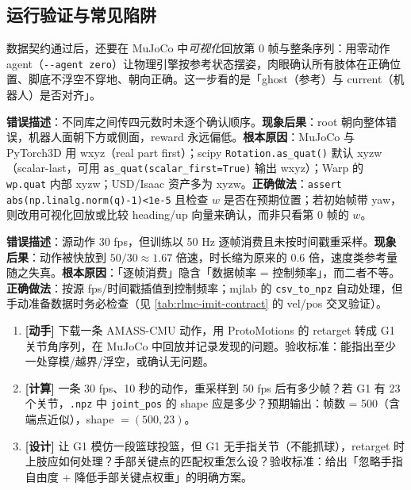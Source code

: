 \subsection{运行验证与常见陷阱}
\label{sec:rlmc-imit-data-verify}

数据契约通过后，还要在 MuJoCo 中\emph{可视化}回放第 0 帧与整条序列：用零动作 agent（\verb|--agent zero|）让物理引擎按参考状态摆姿，肉眼确认所有肢体在正确位置、脚底不浮空不穿地、朝向正确。这一步看的是「ghost（参考）与 current（机器人）是否对齐」。

\begin{pitfall}
\textbf{错误描述}：不同库之间传四元数时未逐个确认顺序。\textbf{现象后果}：root 朝向整体错误，机器人面朝下方或侧面，reward 永远偏低。\textbf{根本原因}：MuJoCo 与 PyTorch3D 用 wxyz（real part first）；scipy \texttt{Rotation.as\_quat()} 默认 xyzw（scalar-last，可用 \texttt{as\_quat(scalar\_first=True)} 输出 wxyz）；Warp 的 \texttt{wp.quat} 内部 xyzw；USD/Isaac 资产多为 xyzw。\textbf{正确做法}：\verb|assert abs(np.linalg.norm(q)-1)<1e-5| 且检查 $w$ 是否在预期位置；若初始帧带 yaw，则改用可视化回放或比较 heading/up 向量来确认，而非只看第 0 帧的 $w$。
\end{pitfall}

\begin{pitfall}[帧率不匹配导致动作变速]
\textbf{错误描述}：源动作 30 fps，但训练以 50 Hz 逐帧消费且未按时间戳重采样。\textbf{现象后果}：动作被快放到 $50/30\approx1.67$ 倍速，时长缩为原来的 0.6 倍，速度类参考量随之失真。\textbf{根本原因}：「逐帧消费」隐含「数据帧率 = 控制频率」，而二者不等。\textbf{正确做法}：按源 fps/时间戳插值到控制频率；mjlab 的 \verb|csv_to_npz| 自动处理，但手动准备数据时务必检查（见 \cref{tab:rlmc-imit-contract} 的 vel/pos 交叉验证）。
\end{pitfall}

\begin{practice}[练习·数据管线]
\begin{enumerate}
  \item \textbf{[动手]} 下载一条 AMASS-CMU 动作，用 ProtoMotions 的 retarget 转成 G1 关节角序列，在 MuJoCo 中回放并记录发现的问题。验收标准：能指出至少一处穿模/越界/浮空，或确认无问题。
  \item \textbf{[计算]} 一条 30 fps、10 秒的动作，重采样到 50 fps 后有多少帧？若 G1 有 23 个关节，\texttt{.npz} 中 \verb|joint_pos| 的 shape 应是多少？预期输出：帧数 = 500（含端点近似），shape $=(500,23)$。
  \item \textbf{[设计]} 让 G1 模仿一段篮球投篮，但 G1 无手指关节（不能抓球），retarget 时上肢应如何处理？手部关键点的匹配权重怎么设？验收标准：给出「忽略手指自由度 + 降低手部关键点权重」的明确方案。
\end{enumerate}
\end{practice}

